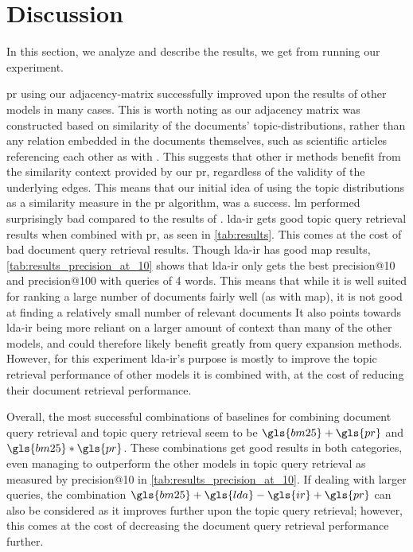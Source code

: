 \section{Discussion}\label{sec:discussion}
In this section, we analyze and describe the results, we get from running our experiment.

\gls{pr} using our adjacency-matrix successfully improved upon the results of other models in many cases.
This is worth noting as our adjacency matrix was constructed based on similarity of the documents' topic-distributions, rather than any relation embedded in the documents themselves, such as scientific articles referencing each other as with \citet{yang2009topic}.
This suggests that other \gls{ir} methods benefit from the similarity context provided by our \gls{pr}, regardless of the validity of the underlying edges.
This means that our initial idea of using the topic distributions as a similarity measure in the \gls{pr} algorithm, was a success.
\gls{lm} performed surprisingly bad compared to the results of \citet{yang2009topic}. 
\gls{lda}-\gls{ir} gets good topic query retrieval results when combined with \gls{pr}, as seen in \autoref{tab:results}.
This comes at the cost of bad document query retrieval results.
Though \gls{lda}-\gls{ir} has good \gls{map} results, \autoref{tab:results_precision_at_10} shows that \gls{lda}-\gls{ir} only gets the best precision@10 and precision@100 with queries of 4 words.
This means that while it is well suited for ranking a large number of documents fairly well (as with \gls{map}), it is not good at finding a relatively small number of relevant documents
It also points towards \gls{lda}-\gls{ir} being more reliant on a larger amount of context than many of the other models, and could therefore likely benefit greatly from query expansion methods.
However, for this experiment \gls{lda}-\gls{ir}'s purpose is mostly to improve the topic retrieval performance of other models it is combined with, at the cost of reducing their document retrieval performance.

Overall, the most successful combinations of baselines for combining document query retrieval and topic query retrieval seem to be $\gls{bm25}+\gls{pr}$ and $\gls{bm25}*\gls{pr}$.
These combinations get good results in both categories, even managing to outperform the other models in topic query retrieval as measured by precision@10 in \autoref{tab:results_precision_at_10}.
If dealing with larger queries, the combination $\gls{bm25}+\gls{lda}-\gls{ir}+\gls{pr}$ can also be considered as it improves further upon the topic query retrieval; however, this comes at the cost of decreasing the document query retrieval performance further.

